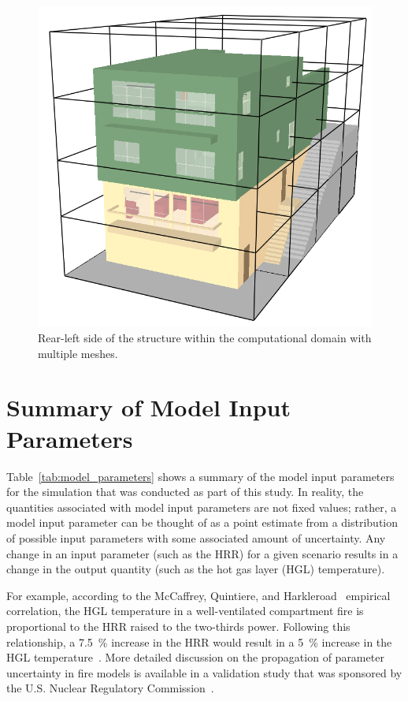 \documentclass[12pt,oneside]{book}
\begin{document}
\begin{figure}[!ht]
\includegraphics[width=4.5in]{../Figures/SMV_Exterior_Meshes}
\caption[Rear-left side of the structure within the computational domain.]
{Rear-left side of the structure within the computational domain with multiple meshes.}
\label{fig:mult_mesh}
\end{figure}


\clearpage


\section{Summary of Model Input Parameters}
\label{sec:summary_of_model_inputs}

Table~\ref{tab:model_parameters} shows a summary of the model input parameters for the simulation that was conducted as part of this study. In reality, the quantities associated with model input parameters are not fixed values; rather, a model input parameter can be thought of as a point estimate from a distribution of possible input parameters with some associated amount of uncertainty. Any change in an input parameter (such as the HRR) for a given scenario results in a change in the output quantity (such as the hot gas layer (HGL) temperature).

For example, according to the McCaffrey, Quintiere, and Harkleroad~\cite{SFPE:Walton} empirical correlation, the HGL temperature in a well-ventilated compartment fire is proportional to the HRR raised to the two-thirds power. Following this relationship, a 7.5~\% increase in the HRR would result in a 5~\% increase in the HGL temperature~\cite{NUREG_1824_Sup_1}. More detailed discussion on the propagation of parameter uncertainty in fire models is available in a validation study that was sponsored by the U.S. Nuclear Regulatory Commission~\cite{NUREG_1824_Sup_1}.
\end{document}
